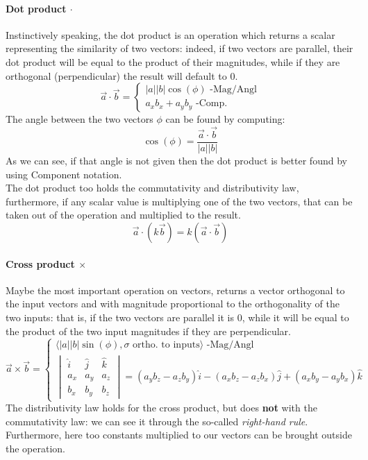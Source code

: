 \paragraph{Dot product $\cdot$} Instinctively speaking, the dot product is an operation which returns a scalar representing the similarity of two vectors: indeed, if two vectors are parallel, their dot product will be equal to the product of their magnitudes, while if they are orthogonal (perpendicular) the result will default to $0$.
\begin{equation}
    \vec{a}\cdot\vec{b} = \begin{cases}
        |a||b|\cos(\phi)\mbox{ -Mag/Angl}\\
        a_xb_x+a_yb_y\mbox{ -Comp.}
    \end{cases}
\end{equation}
The angle between the two vectors $\phi$ can be found by computing:
\begin{equation}
    \cos(\phi) = \frac{\vec{a}\cdot\vec{b}}{|a||b|}
\end{equation}
As we can see, if that angle is not given then the dot product is better found by using Component notation.\\
The dot product too holds the commutativity and distributivity law, furthermore, if any scalar value is multiplying one of the two vectors, that can be taken out of the operation and multiplied to the result.
\begin{equation}
    \vec{a}\cdot(k\vec{b}) = k(\vec{a}\cdot\vec{b})
\end{equation}
\paragraph{Cross product $\times$} Maybe the most important operation on vectors, returns a vector orthogonal to the input vectors and with magnitude proportional to the orthogonality of the two inputs: that is, if the two vectors are parallel it is $0$, while it will be equal to the product of the two input magnitudes if they are perpendicular.
\begin{equation}
    \vec{a}\times\vec{b} = \begin{cases}
        \langle |a||b|\sin(\phi), \sigma\mbox{ ortho. to inputs}\rangle\mbox{ -Mag/Angl}\\
        \begin{vmatrix}
            \hat{i}&\hat{j}&\hat{k}\\
            a_x&a_y&a_z\\
            b_x&b_y&b_z
        \end{vmatrix}= (a_yb_z-a_zb_y)\hat{i} - (a_xb_z-a_zb_x)\hat{j} + (a_xb_y-a_yb_x)\hat{k}
    \end{cases}
\end{equation}
The distributivity law holds for the cross product, but does \textbf{not} with the commutativity law: we can see it through the so-called \emph{right-hand rule}. Furthermore, here too constants multiplied to our vectors can be brought outside the operation.

